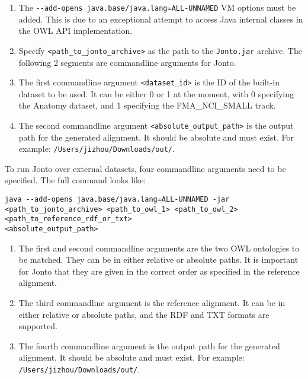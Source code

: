 \begin{appendices}
\begin{enumerate}
\def\labelenumi{\arabic{enumi}.}
\item
  The \texttt{-{}-add-opens java.base/java.lang=ALL-UNNAMED} VM options
  must be added. This is due to an exceptional attempt to access Java
  internal classes in the OWL API implementation.
\item
  Specify \texttt{\textless{}path\_to\_jonto\_archive\textgreater{}} as
  the path to the \texttt{Jonto.jar} archive. The following 2 segments
  are commandline arguments for Jonto.
\item
  The first commandline argument
  \texttt{\textless{}dataset\_id\textgreater{}} is the ID of the
  built-in dataset to be used. It can be either 0 or 1 at the moment,
  with 0 specifying the Anatomy dataset, and 1 specifying the
  FMA\_NCI\_SMALL track.
\item
  The second commandline argument
  \texttt{\textless{}absolute\_output\_path\textgreater{}} is the output
  path for the generated alignment. It should be absolute and must
  exist. For example: \texttt{/Users/jizhou/Downloads/out/}.
\end{enumerate}

To run Jonto over external datasets, four commandline arguments need to
be specified. The full command looks like:

\texttt{java -{}-add-opens java.base/java.lang=ALL-UNNAMED -jar \textless{}path\_to\_jonto\_archive\textgreater{} \textless{}path\_to\_owl\_1\textgreater{} \textless{}path\_to\_owl\_2\textgreater{} \textless{}path\_to\_reference\_rdf\_or\_txt\textgreater{}\\\textless{}absolute\_output\_path\textgreater{}}

\begin{enumerate}
\def\labelenumi{\arabic{enumi}.}
\item
  The first and second commandline arguments are the two OWL ontologies
  to be matched. They can be in either relative or absolute paths. It is
  important for Jonto that they are given in the correct order as
  specified in the reference alignment.
\item
  The third commandline argument is the reference alignment. It can be
  in either relative or absolute paths, and the RDF and TXT formats are
  supported.
\item
  The fourth commandline argument is the output path for the generated
  alignment. It should be absolute and must exist. For example:
  \texttt{/Users/jizhou/Downloads/out/}.
\end{enumerate}


\end{appendices}
